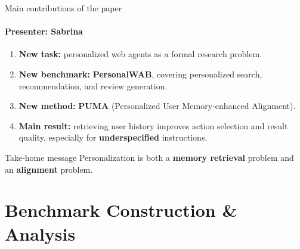 \documentclass[10pt]{beamer}
\newcommand{\speaker}[1]{\framesubtitle{Presenter: #1}}
\begin{document}
\begin{frame}{Main contributions of the paper}
  \speaker{Sabrina}
  \begin{enumerate}
    \item \textbf{New task:} personalized web agents as a formal research problem.
    \item \textbf{New benchmark:} \textbf{PersonalWAB}, covering personalized search, recommendation, and review generation.
    \item \textbf{New method:} \textbf{PUMA} (Personalized User Memory-enhanced Alignment).
    \item \textbf{Main result:} retrieving user history improves action selection and result quality, especially for \textbf{underspecified} instructions.
  \end{enumerate}
  \vspace{0.4em}
  \begin{block}{Take-home message}
    \small Personalization is both a \textbf{memory retrieval} problem and an \textbf{alignment} problem.
  \end{block}
\end{frame}

\section{Benchmark Construction \& Analysis}
\end{document}
